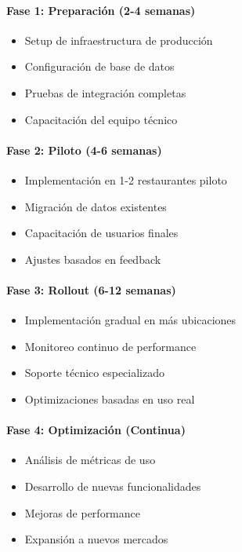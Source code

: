 \documentclass[12pt,a4paper]{article}
\begin{document}
\paragraph{Fase 1: Preparación (2-4 semanas)}
\begin{itemize}
    \item Setup de infraestructura de producción
    \item Configuración de base de datos
    \item Pruebas de integración completas
    \item Capacitación del equipo técnico
\end{itemize}

\paragraph{Fase 2: Piloto (4-6 semanas)}
\begin{itemize}
    \item Implementación en 1-2 restaurantes piloto
    \item Migración de datos existentes
    \item Capacitación de usuarios finales
    \item Ajustes basados en feedback
\end{itemize}

\paragraph{Fase 3: Rollout (6-12 semanas)}
\begin{itemize}
    \item Implementación gradual en más ubicaciones
    \item Monitoreo continuo de performance
    \item Soporte técnico especializado
    \item Optimizaciones basadas en uso real
\end{itemize}

\paragraph{Fase 4: Optimización (Continua)}
\begin{itemize}
    \item Análisis de métricas de uso
    \item Desarrollo de nuevas funcionalidades
    \item Mejoras de performance
    \item Expansión a nuevos mercados
\end{itemize}
\end{document}
